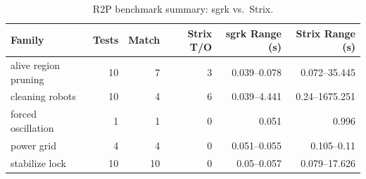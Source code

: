 \begin{table}[htbp]
\centering
\caption{R2P benchmark summary: sgrk vs.\ Strix.}
\label{tab:R2P_summary}
\begin{tabular}{l r r r r r}
\toprule
Family & Tests & Match & Strix T/O & sgrk Range (s) & Strix Range (s) \\
\midrule
alive region pruning & 10 & 7 & 3 & 0.039--0.078 & 0.072--35.445 \\
cleaning robots & 10 & 4 & 6 & 0.039--4.441 & 0.24--1675.251 \\
forced oscillation & 1 & 1 & 0 & 0.051 & 0.996 \\
power grid & 4 & 4 & 0 & 0.051--0.055 & 0.105--0.11 \\
stabilize lock & 10 & 10 & 0 & 0.05--0.057 & 0.079--17.626 \\
\bottomrule
\end{tabular}
\end{table}
